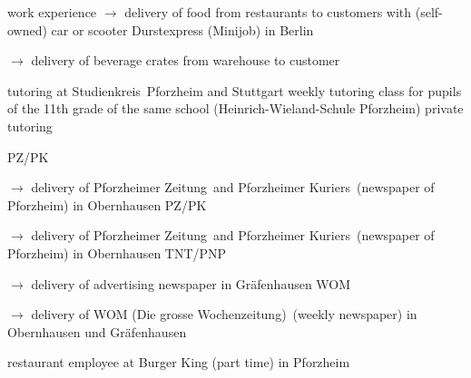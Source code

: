 \begin{rubric}{\textcolor{black!20!blue!100}{work experience}}
			\setlength{\hangindent}{\widthof{$\rightarrow$ }}
			$\rightarrow$ delivery of food from restaurants to customers with (self-owned) car or scooter
		\entry*[17/07/2020 --- 18/10/2020]
			Durstexpress (Minijob) in Berlin
			
			\setlength{\hangindent}{\widthof{$\rightarrow$ }}
			$\rightarrow$ delivery of beverage crates from warehouse to customer
				
		\entry*[10/2015 --- 01/2016]
			tutoring at \glqq Studienkreis\grqq\ Pforzheim and Stuttgart
		\entry*[10/2011 --- 06/2012]
			weekly tutoring class for pupils of the 11th grade of the same school (Heinrich-Wieland-Schule Pforzheim)
		\entry*[\phantom{10/}2010 --- 2016]
			private tutoring
			
		\entry*[08/2015 --- 09/2015]
			PZ/PK
			
			\setlength{\hangindent}{\widthof{$\rightarrow$ }}
			$\rightarrow$ delivery of \glqq Pforzheimer Zeitung\grqq\ and \glqq Pforzheimer Kuriers\grqq\ (newspaper of Pforzheim) in Obernhausen
		\entry*[08/2012 --- 09/2012]
			PZ/PK
			
			\setlength{\hangindent}{\widthof{$\rightarrow$ }}
			$\rightarrow$ delivery of \glqq Pforzheimer Zeitung\grqq\ and \glqq Pforzheimer Kuriers\grqq\ (newspaper of Pforzheim) in Obernhausen
		\entry*[06/2009 --- 10/2010]
			TNT/PNP
			
			\setlength{\hangindent}{\widthof{$\rightarrow$ }}
			$\rightarrow$ delivery of advertising newspaper in Gräfenhausen
		\entry*[06/2007 --- 12/2008]
			WOM
			
			\setlength{\hangindent}{\widthof{$\rightarrow$ }}
			$\rightarrow$ delivery of \glqq WOM (Die grosse Wochenzeitung)\grqq\ (weekly newspaper) in Obernhausen und Gräfenhausen
			
		\entry*[04/2012 --- 10/2012]
			restaurant employee at Burger King (part time) in Pforzheim
\end{rubric}
\versionLanguageEnd
